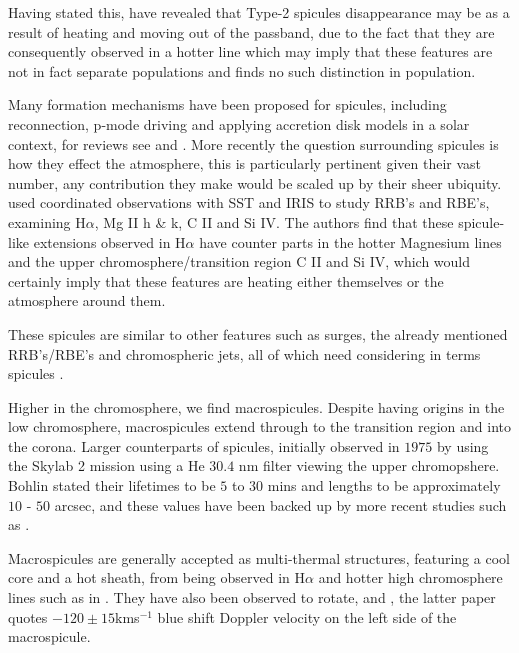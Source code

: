 \documentclass{emulateapj}
\begin{document}
Having stated this, \cite{Pereira2014} have revealed that Type-2 spicules disappearance may be as a result of heating and moving out of the passband, due to the fact that they are consequently observed in a hotter line which may imply that these features are not in fact separate populations and \cite{Zhang2012} finds no such distinction in population.

Many formation mechanisms have been proposed for spicules, including reconnection, p-mode driving and applying accretion disk models in a solar context, for reviews see \cite{Sterling2000} and \cite{Zaqara_Erdelyi2009}.
More recently the question surrounding spicules is how they effect the atmosphere, this is particularly pertinent given their vast number, any contribution they make would be scaled up by their sheer ubiquity.
\cite{Rouppe2015} used coordinated observations with SST and IRIS to study RRB's and RBE's, examining H$\alpha$, Mg II h \& k, C II and Si IV.
The authors find that these spicule-like extensions observed in H$\alpha$ have counter parts in the hotter Magnesium lines and the upper chromosphere/transition region C II and Si IV, which would certainly imply that these features are heating either themselves or the atmosphere around them.

These spicules are similar to other features such as surges, the already mentioned RRB's/RBE's and chromospheric jets, all of which need considering in terms spicules \citep{Tsiropoula2012}.


Higher in the chromosphere, we find macrospicules.
Despite having origins in the low chromosphere, macrospicules extend through to the transition region and into the corona. 
Larger counterparts of spicules, initially observed in $1975$ by \cite{Bohlin1975} using the Skylab 2 mission using a He $30.4$ nm filter viewing the upper chromopshere.
Bohlin stated their lifetimes to be $5$ to $30$ mins and lengths to be approximately $10$ - $50$ arcsec, and these values have been backed up by more recent studies such as \cite{Bennett2015}.

Macrospicules are generally accepted as multi-thermal structures, featuring a cool core and a hot sheath, from being observed in H$\alpha$ \citep{LaBonte79} and hotter high chromosphere lines such as in \cite{Parenti2002}.
They have also been observed to rotate, \cite{Pike_Mason1998} and \cite{Kamio2010}, the latter paper quotes $-120 \pm 15$kms$^{-1}$ blue shift Doppler velocity on the left side of the macrospicule. 
\end{document}

